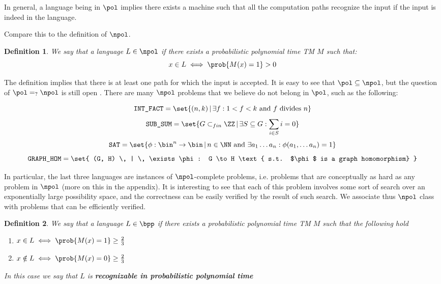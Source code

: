 \documentclass{article}
\newtheorem{definition}{Definition}
\begin{document}
In general, a language being in $\pol$ implies there exists a machine such that all the computation paths recognize the input if the input is indeed in the language. \par

Compare this to the definition of $\npol$.

\begin{definition}
    We say that a language $L \in \npol$ if there exists a probabilistic polynomial time TM $M$ such that:
    \[x \in L \iff \prob{M(x) = 1} > 0\]
\end{definition}

The definition implies that there is at least one path for which the input is accepted. It is easy to see that $\pol \subseteq \npol$, but the question of $\pol =_? \npol$ is still open \cite{cookComplexityTheoremprovingProcedures1971} \cite{jaffeMillenniumGrandChallenge2006}. There are many $\npol$ problems that we believe do not belong in $\pol$, such as the following:

\[ \texttt{INT\_FACT} = \set{ (n, k) \, | \, \exists f : 1 < f < k \text { and } f \text{ divides } n}\]
\[ \texttt{SUB\_SUM} = \set{ G \subset_{fin} \ZZ \, | \, \exists S \subseteq G : \sum_{i \in S} i = 0  } \]
\[ \texttt{SAT} = \set{ \phi : \bin^n \to \bin \, | \, n \in \NN \text{ and } \exists a_1 \dots a_n : \phi(a_1, \dots a_n) = 1 } \]
\[ \texttt{GRAPH\_HOM} = \set{ (G, H) \, | \, \exists \phi : G \to H \text{ s.t. $\phi$ is a graph homomorphism} }\]

In particular, the last three languages are instances of $\npol$-complete problems, i.e. problems that are conceptually as hard as any problem in $\npol$ (more on this in the appendix). It is interesting to see that each of this problem involves some sort of search over an exponentially large possibility space, and the correctness can be easily verified by the result of such search. We associate thus $\npol$ class with problems that can be efficiently verified.

\begin{definition}
    We say that a language $L \in \bpp$ if there exists a probabilistic polynomial time TM $M$ such that the following hold
    \begin{enumerate}
        \item $x \in L \iff \prob{M(x) = 1} \geq \frac{2}{3}$
        \item $x \notin L \iff \prob{M(x) = 0} \geq \frac{2}{3}$
    \end{enumerate}
    In this case we say that $L$ is \textbf{recognizable in probabilistic polynomial time}
\end{definition}
\end{document}
